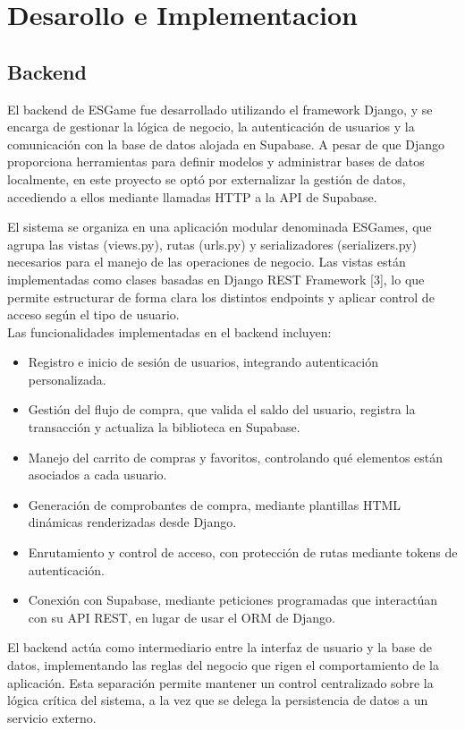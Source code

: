 \documentclass[conference]{IEEEtran}
\begin{document}
\section{Desarollo e Implementacion}

\subsection{Backend}

El backend de ESGame fue desarrollado utilizando el framework Django, y se encarga de gestionar la lógica de negocio, la autenticación de usuarios y la comunicación con la base de datos alojada en Supabase. A pesar de que Django proporciona herramientas para definir modelos y administrar bases de datos localmente, en este proyecto se optó por externalizar la gestión de datos, accediendo a ellos mediante llamadas HTTP a la API de Supabase.

El sistema se organiza en una aplicación modular denominada ESGames, que agrupa las vistas (views.py), rutas (urls.py) y serializadores (serializers.py) necesarios para el manejo de las operaciones de negocio. Las vistas están implementadas como clases basadas en Django REST Framework [3], lo que permite estructurar de forma clara los distintos endpoints y aplicar control de acceso según el tipo de usuario.\\

Las funcionalidades implementadas en el backend incluyen:
\begin{itemize}
	\item Registro e inicio de sesión de usuarios, integrando autenticación personalizada.
	\item Gestión del flujo de compra, que valida el saldo del usuario, registra la transacción y actualiza la biblioteca en Supabase.
	\item Manejo del carrito de compras y favoritos, controlando qué elementos están asociados a cada usuario.
	\item Generación de comprobantes de compra, mediante plantillas HTML dinámicas renderizadas desde Django.
	\item Enrutamiento y control de acceso, con protección de rutas mediante tokens de autenticación.
	\item Conexión con Supabase, mediante peticiones programadas que interactúan con su API REST, en lugar de usar el ORM de Django.
\end{itemize}

El backend actúa como intermediario entre la interfaz de usuario y la base de datos, implementando las reglas del negocio que rigen el comportamiento de la aplicación. Esta separación permite mantener un control centralizado sobre la lógica crítica del sistema, a la vez que se delega la persistencia de datos a un servicio externo.
\end{document}
